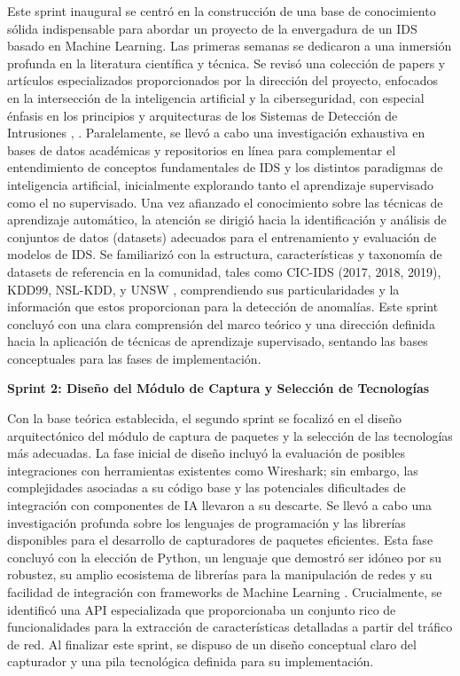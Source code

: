 Este sprint inaugural se centró en la construcción de una base de conocimiento sólida indispensable para abordar un proyecto de la envergadura de un IDS basado en Machine Learning. Las primeras semanas se dedicaron a una inmersión profunda en la literatura científica y técnica. Se revisó una colección de papers y artículos especializados proporcionados por la dirección del proyecto, enfocados en la intersección de la inteligencia artificial y la ciberseguridad, con especial énfasis en los principios y arquitecturas de los Sistemas de Detección de Intrusiones \cite{Charmet2022XAI}, \cite{Zhang2022AICybersecurity}. Paralelamente, se llevó a cabo una investigación exhaustiva en bases de datos académicas y repositorios en línea para complementar el entendimiento de conceptos fundamentales de IDS y los distintos paradigmas de inteligencia artificial, inicialmente explorando tanto el aprendizaje supervisado como el no supervisado. Una vez afianzado el conocimiento sobre las técnicas de aprendizaje automático, la atención se dirigió hacia la identificación y análisis de conjuntos de datos (datasets) adecuados para el entrenamiento y evaluación de modelos de IDS. Se familiarizó con la estructura, características y taxonomía de datasets de referencia en la comunidad, tales como CIC-IDS (2017, 2018, 2019), KDD99, NSL-KDD, y UNSW \cite{PolaniaArias2021EvaluacionMLIDS}, comprendiendo sus particularidades y la información que estos proporcionan para la detección de anomalías. Este sprint concluyó con una clara comprensión del marco teórico y una dirección definida hacia la aplicación de técnicas de aprendizaje supervisado, sentando las bases conceptuales para las fases de implementación.

\textbf{Sprint 2: Diseño del Módulo de Captura y Selección de Tecnologías} 

Con la base teórica establecida, el segundo sprint se focalizó en el diseño arquitectónico del módulo de captura de paquetes y la selección de las tecnologías más adecuadas. La fase inicial de diseño incluyó la evaluación de posibles integraciones con herramientas existentes como Wireshark; sin embargo, las complejidades asociadas a su código base y las potenciales dificultades de integración con componentes de IA llevaron a su descarte. Se llevó a cabo una investigación profunda sobre los lenguajes de programación y las librerías disponibles para el desarrollo de capturadores de paquetes eficientes. Esta fase concluyó con la elección de Python, un lenguaje que demostró ser idóneo por su robustez, su amplio ecosistema de librerías para la manipulación de redes \cite{Shrefler2017Networking} y su facilidad de integración con frameworks de Machine Learning \cite{Pedregosa2011ScikitLearn}. Crucialmente, se identificó una API especializada que proporcionaba un conjunto rico de funcionalidades para la extracción de características detalladas a partir del tráfico de red. Al finalizar este sprint, se dispuso de un diseño conceptual claro del capturador y una pila tecnológica definida para su implementación.

